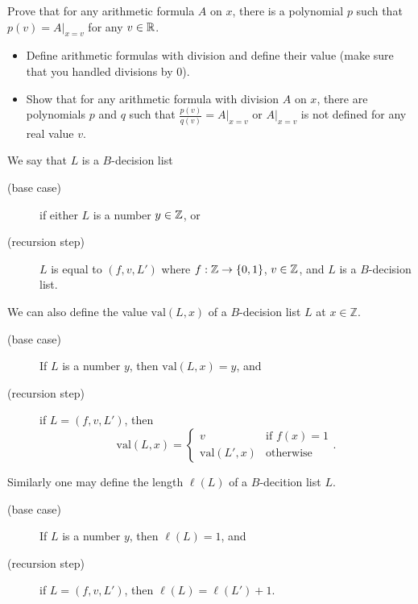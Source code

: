 \begin{chapterendexercises}
    Prove that for any arithmetic formula $A$ on $x$, there is a polynomial
    $p$ such that $p(v) = A\big\rvert_{x = v}$ for any $v \in {\mathbb{R}}$.
  \exercise
    \begin{itemize}           
      \item Define arithmetic formulas with division and define their value (make
        sure that you handled divisions by $0$).
      \item Show that for any arithmetic formula with division $A$ on $x$,
        there are polynomials $p$ and $q$ such that $\frac{p(v)}{q(v)} =
        A\big\rvert_{x = v}$ or $A\big\rvert_{x = v}$ is not defined for
        any real value $v$.
    \end{itemize}
  \exercise[recommended]
    We say that $L$ is a $B$-decision list 
    \begin{description}
      \item[(base case)] if either $L$ is a number $y \in {\mathbb{Z}}$, or
      \item[(recursion step)] $L$ is equal to $(f, v, L')$ where $f : \Z \to
        \set{0, 1}$, $v \in {\mathbb{Z}}$, and $L$ is a $B$-decision list.
    \end{description}

    We can also define the value $\mathrm{val}(L, x)$ of a $B$-decision list $L$ at
    $x \in \mathbb{Z}$.
    \begin{description}
      \item[(base case)] If $L$ is a number $y$, then $\mathrm{val}(L, x) = y$, and
      \item[(recursion step)] if $L = (f, v, L')$, then
        \[
          \mathrm{val}(L, x) = 
          \begin{cases}
            v & \text{if } f(x) = 1 \\
            \mathrm{val}(L', x) & \text{otherwise}
          \end{cases}.
        \]
    \end{description}

    Similarly one may define the length $\ell(L)$ of a $B$-decition list $L$.
    \begin{description}
      \item[(base case)] If $L$ is a number $y$, then $\ell(L) = 1$, and
      \item[(recursion step)] if $L = (f, v, L')$, then $\ell(L) = \ell(L') + 1$.
    \end{description}


\end{chapterendexercises}

